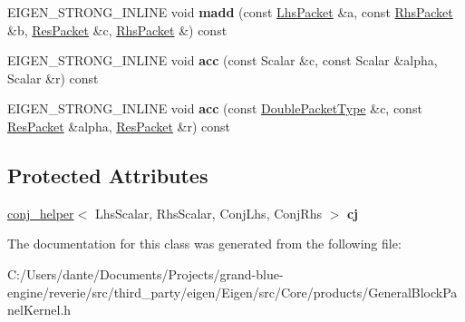 \begin{DoxyCompactItemize}
\mbox{\label{class_eigen_1_1internal_1_1gebp__traits_3_01std_1_1complex_3_01_real_scalar_01_4_00_01std_1_1com3fbe501975c876a010def81ad2701521_afa6b7516872a329728cd0298d8f0bcbc}} 
E\+I\+G\+E\+N\+\_\+\+S\+T\+R\+O\+N\+G\+\_\+\+I\+N\+L\+I\+NE void {\bfseries madd} (const \mbox{\hyperlink{struct_eigen_1_1internal_1_1true__type}{Lhs\+Packet}} \&a, const \mbox{\hyperlink{struct_eigen_1_1internal_1_1true__type}{Rhs\+Packet}} \&b, \mbox{\hyperlink{struct_eigen_1_1internal_1_1true__type}{Res\+Packet}} \&c, \mbox{\hyperlink{struct_eigen_1_1internal_1_1true__type}{Rhs\+Packet}} \&) const
\item 
\mbox{\label{class_eigen_1_1internal_1_1gebp__traits_3_01std_1_1complex_3_01_real_scalar_01_4_00_01std_1_1com3fbe501975c876a010def81ad2701521_af786857c44a60615f2f2ff2124d792c8}} 
E\+I\+G\+E\+N\+\_\+\+S\+T\+R\+O\+N\+G\+\_\+\+I\+N\+L\+I\+NE void {\bfseries acc} (const Scalar \&c, const Scalar \&alpha, Scalar \&r) const
\item 
\mbox{\label{class_eigen_1_1internal_1_1gebp__traits_3_01std_1_1complex_3_01_real_scalar_01_4_00_01std_1_1com3fbe501975c876a010def81ad2701521_a6ee150d8ddc491faf9f1fa5f0f8b2708}} 
E\+I\+G\+E\+N\+\_\+\+S\+T\+R\+O\+N\+G\+\_\+\+I\+N\+L\+I\+NE void {\bfseries acc} (const \mbox{\hyperlink{struct_eigen_1_1internal_1_1_double_packet}{Double\+Packet\+Type}} \&c, const \mbox{\hyperlink{struct_eigen_1_1internal_1_1true__type}{Res\+Packet}} \&alpha, \mbox{\hyperlink{struct_eigen_1_1internal_1_1true__type}{Res\+Packet}} \&r) const
\end{DoxyCompactItemize}
\subsection*{Protected Attributes}
\begin{DoxyCompactItemize}
\item 
\mbox{\label{class_eigen_1_1internal_1_1gebp__traits_3_01std_1_1complex_3_01_real_scalar_01_4_00_01std_1_1com3fbe501975c876a010def81ad2701521_aade86e97b1bd726a729070cadd3e1805}} 
\mbox{\hyperlink{struct_eigen_1_1internal_1_1conj__helper}{conj\+\_\+helper}}$<$ Lhs\+Scalar, Rhs\+Scalar, Conj\+Lhs, Conj\+Rhs $>$ {\bfseries cj}
\end{DoxyCompactItemize}


The documentation for this class was generated from the following file\+:\begin{DoxyCompactItemize}
\item 
C\+:/\+Users/dante/\+Documents/\+Projects/grand-\/blue-\/engine/reverie/src/third\+\_\+party/eigen/\+Eigen/src/\+Core/products/General\+Block\+Panel\+Kernel.\+h\end{DoxyCompactItemize}
